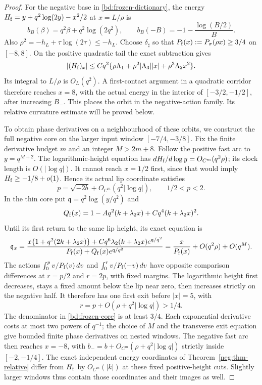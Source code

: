 \begin{proof}
For the negative base in \eqref{bd:frozen-dictionary}, the energy
\(H_{\rm f}=y+q^2\log(2y)-x^2/2\) at \(x=L/\rho\) is
\begin{equation}\label{bd:frozen-incoming}
 b_B(\beta)=q^2\beta+q^2\log(2q^2),\qquad
 b_B(-B)=-1-\frac{\log(B/2)}B.
\end{equation}
Also \(\rho^2=-h_L+\tau\log(2\tau)\le-h_L\).
Choose \(\delta_\sharp\) so that
\(P_{\rm f}(x):=P_\sigma(\rho x)\ge3/4\) on
\([-8,8]\).  On the positive quadratic tail the exact subtraction
gives
\[
 |(H_{\rm f})_x|
 \le Cq^2\{\rho\Lambda_1+
             \rho^2|\Lambda_3||x|+\rho^3\Lambda_2x^2\}.
\]
Its integral to \(L/\rho\) is \(O_L(q^2)\).  A first-contact
argument in a quadratic corridor therefore reaches \(x=8\), with
the actual energy in the interior of \([-3/2,-1/2]\), after increasing \(B_-\). This places the orbit in the negative-action
family. Its relative curvature estimate will be proved below.

To obtain phase derivatives on a neighbourhood of these orbits, we
construct the full negative core on the larger input window
\([-7/4,-3/8]\).  Fix the finite derivative budget \(m\) and an
integer \(M>2m+8\).  Follow the positive fast arc to
\(y=q^{M+2}\).  The logarithmic-height equation has
\(dH_{\rm f}/d\log y=O_{C^m}(q^2\rho)\); its clock length is
\(O(|\log q|)\).  It cannot reach \(x=1/2\) first, since that
would imply \(H_{\rm f}\ge-1/8+o(1)\).  Hence its actual lip
coordinate satisfies
\[
 p=\sqrt{-2b}+O_{C^m}(q^2|\log q|),\qquad 1/2<p<2.
\]
In the thin core put \(\mathfrak q=q^2\log(y/q^2)\) and
\[
 Q_{\rm f}(x)=1-Aq^2(k+\lambda_2x)
                        +Cq^4(k+\lambda_2x)^2.
\]
Until its first return to the same lip height, its exact equation is
\begin{equation}\label{bd:frozen-core}
 \mathfrak q_x=
 \frac{x\{1+q^2(2k+\lambda_2x)\}
       +Cq^6\lambda_2(k+\lambda_2x)e^{\mathfrak q/q^2}}
      {P_{\rm f}(x)+Q_{\rm f}(x)e^{\mathfrak q/q^2}}
 =\frac{x}{P_{\rm f}(x)}+O(q^2\rho)+O(q^M).
\end{equation}
The actions \(\int_0^p v/P_{\rm f}(v)\,dv\) and
\(\int_0^r v/P_{\rm f}(-v)\,dv\) have opposite comparison
differences at \(r=p/2\) and \(r=2p\), with fixed margins.
The logarithmic height first decreases, stays a fixed amount below
the lip near zero, then increases strictly on the negative half.
It therefore has one first exit before \(|x|=5\), with
\[
 r=p+O(\rho+q^2|\log q|)>1/4.
\]
The denominator in \eqref{bd:frozen-core} is at least \(3/4\).
Each exponential derivative costs at most two powers of \(q^{-1}\);
the choice of \(M\) and the transverse exit equation give bounded
finite phase derivatives on nested windows.  The negative fast arc
then reaches \(x=-8\), with
\(b_-=b+O_{C^m}(\rho+q^2|\log q|)\) strictly inside
\([-2,-1/4]\).  The exact independent energy coordinates of
Theorem~\ref{neg:thm-relative} differ from \(H_{\rm f}\) by
\(O_{C^m}(|k|)\) at these fixed positive-height cuts.  Slightly larger
windows thus contain those coordinates and their images as well.


\end{proof}
